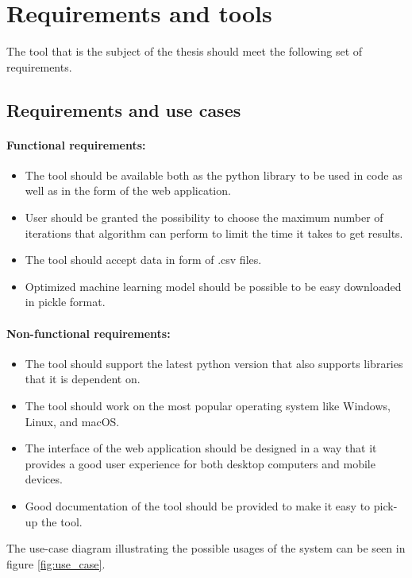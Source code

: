 \documentclass[a4paper,twoside,12pt]{book}
\begin{document}
\chapter{Requirements and tools}

The tool that is the subject of the thesis should meet the following set of requirements.


\section{Requirements and use cases}

\subsubsection{Functional requirements:}

\begin{itemize}
    \item The tool should be available both as the python library to be used in code as well as in the form of the web application.
    \item User should be granted the possibility to choose the maximum number of iterations that algorithm can perform to limit the time it takes to get results.
    \item The tool should accept data in form of .csv files. 
    \item Optimized machine learning model should be possible to be easy downloaded in pickle format.
\end{itemize}
\subsubsection{Non-functional requirements:}
\begin{itemize}
    \item The tool should support the latest python version that also supports libraries that it is dependent on.
    \item The tool should work on the most popular operating system like Windows, Linux, and macOS.
    \item The interface of the web application should be designed in a way that it provides a good user experience for both desktop computers and mobile devices.
    \item Good documentation of the tool should be provided to make it easy to pick-up the tool.
\end{itemize}

The use-case diagram illustrating the possible usages of the system can be seen in figure \ref{fig:use_case}.
\end{document}
